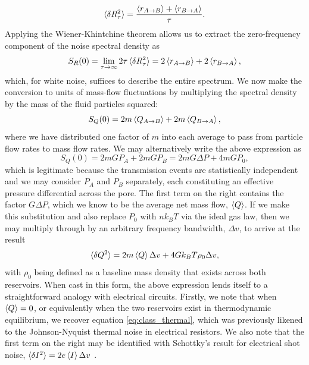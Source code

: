 \documentclass[%
 reprint,
 aps,
 prb,
 epsf,
]{revtex4-2}
\begin{document}
\begin{equation}
   \braket{\delta R_\tau^2}   = \frac{\braket{r_{A\rightarrow B}} + \braket{r_{B\rightarrow A}}}{\tau}.
\end{equation}
Applying the Wiener-Khintchine theorem allows us to extract the zero-frequency component of the noise spectral density as
\begin{equation}
    S_R(0) = \lim_{\tau\rightarrow \infty} 2\tau \braket{\delta R_\tau^2} = 2\braket{r_{A\rightarrow B}} + 2\braket{r_{B\rightarrow A}},
\end{equation}
 which, for white noise, suffices to describe the entire spectrum. We now make the conversion to units of mass-flow fluctuations by multiplying the spectral density by the mass of the fluid particles squared:
 \begin{equation}
     S_Q(0) = 2m\braket{Q_{A\rightarrow B}} + 2m\braket{Q_{B\rightarrow A}},
 \end{equation}
 where we have distributed one factor of $m$ into each average to pass from particle flow rates to mass flow rates. We may alternatively write the above expression as
 \begin{equation}\label{eq:density}
     S_Q(0) = 2mGP_A + 2mGP_B = 2mG\Delta P + 4mGP_0,
 \end{equation}
which is legitimate because the transmission events are statistically independent and we may consider $P_A$ and $P_B$ separately, each constituting an effective pressure differential across the pore. The first term on the right contains the factor $G\Delta P $, which we know to be the average net mass flow, $\braket{Q}$. If we make this substitution and also replace $P_0$ with $nk_BT$ via the ideal gas law, then we may multiply through by an arbitrary frequency bandwidth, $\Delta v$, to arrive at the result 
\begin{equation}
    \braket{\delta Q^2} = 2m\braket{Q}\Delta v + 4Gk_BT\rho_0\Delta v,
\end{equation}
with $\rho_0$ being defined as a baseline mass density that exists across both reservoirs. When cast in this form, the above expression lends itself to a straightforward analogy with electrical circuits. Firstly, we note that when $\braket{Q} = 0$, or equivalently when the two reservoirs exist in thermodynamic equilibrium, we recover equation \ref{eq:class_thermal}, which was previously likened to the Johnson-Nyquist thermal noise in electrical resistors. We also note that the first term on the right may be identified with Schottky's result for electrical shot noise, $\braket{\delta I^2} = 2e\braket{I}\Delta v$ \cite{schottky}. \\
\end{document}
